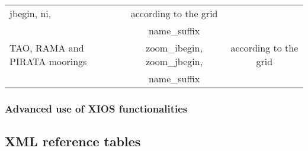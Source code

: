 \documentclass[../main/NEMO_manual]{subfiles}
\begin{document}
\begin{table}
\begin{tabular}{|l|c|c|}
    jbegin, ni,                                                          &
    according to the grid                                                \\
                                                                         &
    name\_suffix                                                         &
                                                                         \\
    \hline
    TAO, RAMA and PIRATA moorings                                        &
    zoom\_ibegin, zoom\_jbegin,                                          &
    according to the grid                                                \\
                                                                         &
    name\_suffix                                                         &
                                                                         \\
    \hline
  \end{tabular}
\end{table}

\subsubsection{Advanced use of XIOS functionalities}

\subsection{XML reference tables}
\label{subsec:DIA_IOM_xmlref}
\end{document}
